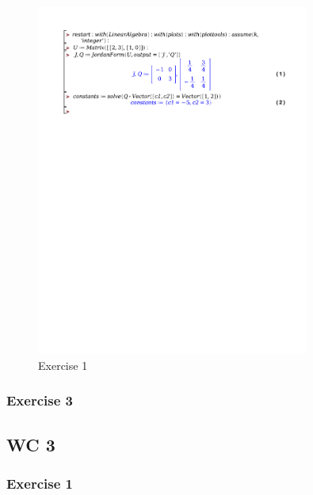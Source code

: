\documentclass[a4paper]{report}
\begin{document}
\begin{figure}[H]
	\centering
	\includegraphics[width=0.8\textwidth]{exercises/bord_3_ex_1.pdf}
	\caption{Exercise 1}
	\label{fig:bord_3_ex_1}
\end{figure}

\subsubsection{Exercise 3}



\subsection{WC 3}

\subsubsection{Exercise 1}
\end{document}
